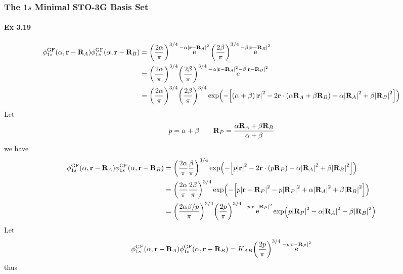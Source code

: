 \documentclass[a4paper]{article}
\DeclareMathOperator{\e}{\mathrm{e}}
\DeclareMathOperator{\GF}{\mathrm{GF}}
\newcommand{\ex}[1]{\paragraph{Ex #1}}
\numberwithin{equation}{subsection}
\begin{document}
\subsubsection{The $ 1s $ Minimal STO-3G Basis Set}
\ex{3.19}
\begin{align}
\phi_{1s}^{\GF}(\alpha,\vb{r}-\vb{R}_A)\phi_{1s}^{\GF}(\alpha,\vb{r}-\vb{R}_B) &= \qty(\dfrac{2\alpha}{\pi})^{3/4} \e^{-\alpha\abs{\vb{r}-\vb{R}_A}^2} \qty(\dfrac{2\beta}{\pi})^{3/4} \e^{-\beta\abs{\vb{r}-\vb{R}_B}^2} \notag\\
&= \qty(\dfrac{2\alpha}{\pi})^{3/4} \qty(\dfrac{2\beta}{\pi})^{3/4} \e^{-\alpha\abs{\vb{r}-\vb{R}_A}^2 - \beta\abs{\vb{r}-\vb{R}_B}^2} \notag\\
&= \qty(\dfrac{2\alpha}{\pi})^{3/4} \qty(\dfrac{2\beta}{\pi})^{3/4} \exp(-\qty[(\alpha+\beta)\abs{\vb{r}}^2 
	- 2\vb{r}\cdot(\alpha\vb{R}_A + \beta\vb{R}_B) 
	+ \alpha\abs{\vb{R}_A}^2 +\beta\abs{\vb{R}_B}^2])
\end{align}
Let
\begin{equation}\label{key}
p = \alpha + \beta \qquad \vb{R}_P = \dfrac{\alpha\vb{R}_A + \beta\vb{R}_B} {\alpha+\beta}
\end{equation}
we have
\begin{align}
\phi_{1s}^{\GF}(\alpha,\vb{r}-\vb{R}_A)\phi_{1s}^{\GF}(\alpha,\vb{r}-\vb{R}_B)
&= \qty(\dfrac{2\alpha}{\pi}\dfrac{\beta}{\pi})^{3/4} 
\exp(-\qty[p\abs{\vb{r}}^2 
	- 2\vb{r}\cdot(p\vb{R}_P) 
	+ \alpha\abs{\vb{R}_A}^2 +\beta\abs{\vb{R}_B}^2]) \notag\\
&= \qty(\dfrac{2\alpha}{\pi}\dfrac{2\beta}{\pi})^{3/4} 
\exp(-\qty[p\abs{\vb{r} - \vb{R}_P}^2 
	- p\abs{\vb{R}_P}^2
	+ \alpha\abs{\vb{R}_A}^2 +\beta\abs{\vb{R}_B}^2]) \notag\\
&= \qty(\dfrac{2\alpha\beta/p}{\pi})^{3/4} \qty(\dfrac{2p}{\pi})^{3/4} 
\e^{-p\abs{\vb{r} - \vb{R}_P}^2 }
\exp(p\abs{\vb{R}_P}^2 - \alpha\abs{\vb{R}_A}^2 - \beta\abs{\vb{R}_B}^2) 
\end{align}
Let
\begin{equation}\label{key}
\phi_{1s}^{\GF}(\alpha,\vb{r}-\vb{R}_A)\phi_{1s}^{\GF}(\alpha,\vb{r}-\vb{R}_B) = K_{AB} \qty(\dfrac{2p}{\pi})^{3/4} 
\e^{-p\abs{\vb{r} - \vb{R}_P}^2 }
\end{equation}
thus
\end{document}
